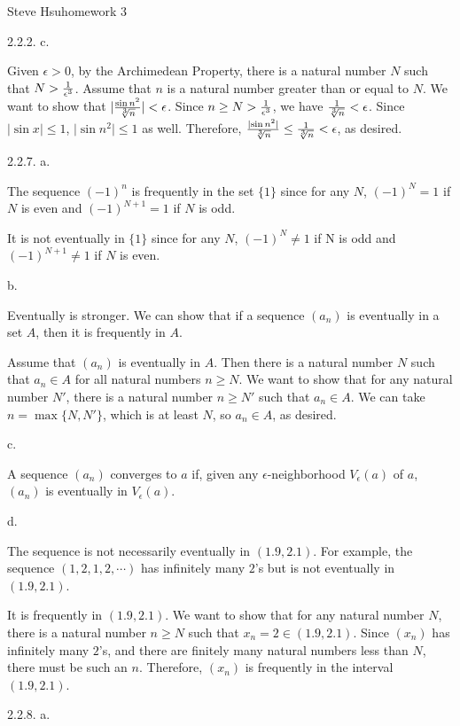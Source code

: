\def\abs#1{\vert{#1}\vert}
\centerline{Steve Hsu\hfill homework 3}
\item{2.2.2.} c.

Given $\epsilon > 0$, by the Archimedean Property,
there is a natural number $N$ such that $N > {1 \over \epsilon^3}$.
Assume that $n$ is a natural number greater than or equal to $N$.
We want to show that $\abs{\sin n^2 \over \root 3 \of n} < \epsilon$.
Since $n \ge N > {1 \over \epsilon^3}$, we have ${1 \over \root 3 \of n} < \epsilon$.
Since $\abs{\sin x} \le 1$, $\abs{\sin n^2} \le 1$ as well.
Therefore, ${\abs{\sin n^2} \over \root 3 \of n} \le {1 \over \root 3 \of n} < \epsilon$,
as desired.
\bigskip
\item{2.2.7.} a.

The sequence $(-1)^n$ is frequently in the set $\{1\}$
since for any $N$, $(-1)^N = 1$ if $N$ is even
and $(-1)^{N+1} = 1$ if $N$ is odd.

It is not eventually in $\{1\}$
since for any $N$, $(-1)^N \ne 1$ if N is odd
and $(-1)^{N+1} \ne 1$ if $N$ is even.
\medskip
\item{} b.

Eventually is stronger.
We can show that if a sequence $(a_n)$ is eventually in a set $A$,
then it is frequently in $A$.

Assume that $(a_n)$ is eventually in $A$.
Then there is a natural number $N$ such that $a_n \in A$
for all natural numbers $n \ge N$.
We want to show that for any natural number $N'$,
there is a natural number $n \ge N'$ such that $a_n \in A$.
We can take $n = \max \{N,N'\}$, which is at least $N$,
so $a_n \in A$, as desired.
\medskip
\item{} c.

A sequence $(a_n)$ converges to $a$ if,
given any $\epsilon$-neighborhood $V_\epsilon(a)$ of $a$,
$(a_n)$ is eventually in $V_\epsilon(a)$.
\medskip
\item{} d.

The sequence is not necessarily eventually in $(1.9, 2.1)$.
For example, the sequence $(1,2,1,2,\cdots)$
has infinitely many $2$'s but is not eventually in $(1.9, 2.1)$.

It is frequently in $(1.9, 2.1)$.
We want to show that for any natural number $N$,
there is a natural number $n \ge N$ such that $x_n = 2 \in (1.9, 2.1)$.
Since $(x_n)$ has infinitely many $2$'s,
and there are finitely many natural numbers less than $N$,
there must be such an $n$.
Therefore, $(x_n)$ is frequently in the interval $(1.9, 2.1)$.
\bigskip
\item{2.2.8.} a.

